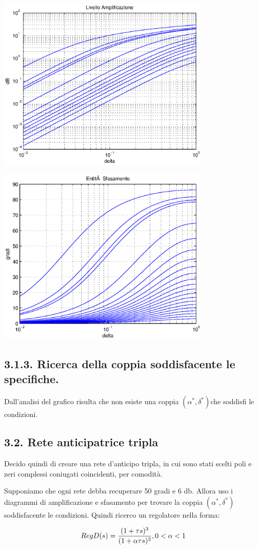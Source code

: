 \documentclass{article}
\begin{document}
\includegraphics [width=4in]{prog6RADICI_05.eps}

\includegraphics [width=4in]{prog6RADICI_06.eps}


\subsection*{3.1.3. Ricerca della coppia soddisfacente le specifiche.}

\begin{par}
Dall'analisi del grafico risulta che non esiste una coppia $ (\alpha^*, \delta^*) $che soddisfi le condizioni.
\end{par}


\subsection*{3.2. Rete anticipatrice tripla}

\begin{par}
Decido quindi di creare una rete d'anticipo tripla, in cui sono stati scelti poli
e zeri complessi coniugati coincidenti, per comodità.

Supponiamo che ogni rete debba recuperare 50 gradi e 6 db.
Allora uso i diagrammi di amplificazione e sfasamento per trovare la coppia
$ (\alpha^{*}, \delta^{*}) $ soddisfacente le condizioni.
Quindi ricerco un regolatore nella forma:

$$ RegD(s) = \frac{(1 + \tau s)^3}{(1 + \alpha \tau s)^3}, \\ 0 < \alpha < 1 $$
\end{par}
\end{document}
